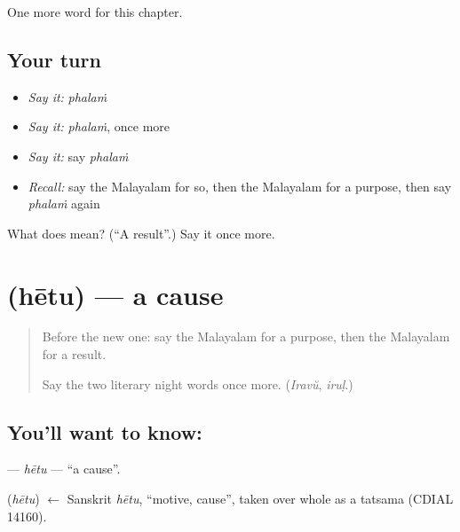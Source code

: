 \begin{grammarlens}[title={What you've built}]
One more word for this chapter.
\end{grammarlens}

\subsection*{Your turn}
\begin{itemize}
\raggedright
  \item \emph{Say it:} \emph{phalaṁ}
  \item \emph{Say it:} \emph{phalaṁ}, once more
  \item \emph{Say it:} say \emph{phalaṁ}
  \item \emph{Recall:} say the Malayalam for so, then the Malayalam for a purpose, then say \emph{phalaṁ} again
\end{itemize}

\begin{tcolorbox}[breakable,colback=teal!4,colframe=teal!35!black,title={Before you move on}]
What does  mean? (\textquotedblleft{}A result\textquotedblright{}.) Say it once more.
\end{tcolorbox}
\section[\texorpdfstring{\ml{ഹേതു} (hētu)}{ഹേതു (hētu)}]{ (hētu) — a cause}

\label{lesson:ML-C144-hetu}



\begin{quote}
Before the new one: say the Malayalam for a purpose, then the Malayalam for a result.

Say the two literary night words once more. (\emph{Iravŭ}, \emph{iruḷ}.)
\end{quote}

\subsection*{You'll want to know: }
\textbf{} — \emph{hētu} — \textquotedblleft{}a cause\textquotedblright{}.

\begin{cousinweb}
\textbf{} (\emph{hētu}) $\leftarrow$ Sanskrit \emph{hētu}, \textquotedblleft{}motive, cause\textquotedblright{}, taken over whole as a tatsama (CDIAL 14160).
\end{cousinweb}


